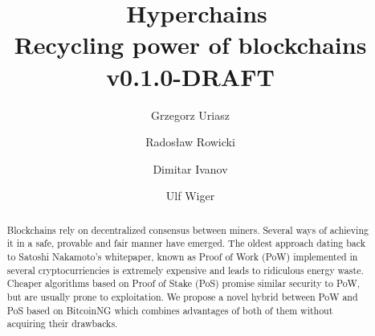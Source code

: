 \documentclass{article}
\title{\huge \Aet\ Hyperchains \\[0.5em]
  \large Recycling power of blockchains
  \\[1em] v0.1.0-DRAFT }
\author{ Grzegorz Uriasz
  \and Radosław Rowicki
  \and Dimitar Ivanov
  \and Ulf Wiger
}
\begin{document}
\maketitle

\begin{abstract}
  Blockchains rely on decentralized consensus between miners. Several ways of
  achieving it in a safe, provable and fair manner have emerged. The oldest
  approach dating back to Satoshi Nakamoto's whitepaper, known as Proof of Work
  (PoW) implemented in several cryptocurriencies is extremely expensive and
  leads to ridiculous energy waste. Cheaper algorithms based on Proof of Stake (PoS)
  promise similar security to PoW, but are usually prone to exploitation. We
  propose a novel hybrid between PoW and PoS based on BitcoinNG which combines
  advantages of both of them without acquiring their drawbacks.
\end{abstract}


\tableofcontents

\newpage







 
\end{document}
